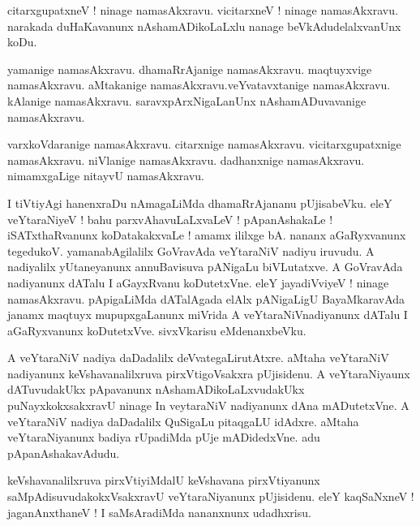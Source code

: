 \documentclass{article}
\begin{document}
\begin{mn}%
citarxgupatxneV ! ninage namasAkxravu. vicitarxneV ! ninage namasAkxravu. narakada duHaKavanunx 
nAshamADikoLaLxlu nanage beVkAdudelalxvanUnx koDu.
\end{mn}

\begin{mn}%
yamanige namasAkxravu. dhamaRrAjanige namasAkxravu. maqtuyxvige namasAkxravu. aMtakanige 
namasAkxravu.veYvatavxtanige namasAkxravu. kAlanige namasAkxravu. saravxpArxNigaLanUnx 
nAshamADuvavanige namasAkxravu.
\end{mn}

\begin{mn}%
varxkoVdaranige namasAkxravu. citarxnige namasAkxravu. vicitarxgupatxnige namasAkxravu. niVlanige 
namasAkxravu. dadhanxnige namasAkxravu. nimamxgaLige nitayvU namasAkxravu.
\end{mn}

\begin{mn}%
I tiVtiyAgi hanenxraDu nAmagaLiMda dhamaRrAjananu pUjisabeVku. eleY veYtaraNiyeV ! bahu 
parxvAhavuLaLxvaLeV ! pApanAshakaLe ! iSATxthaRvanunx koDatakakxvaLe ! amamx ililxge bA. nananx 
aGaRyxvanunx tegedukoV. yamanabAgilalilx GoVravAda veYtaraNiV nadiyu iruvudu. A nadiyalilx 
yUtaneyanunx annuBavisuva pANigaLu biVLutatxve. A GoVravAda nadiyanunx dATalu I aGayxRvanu 
koDutetxVne. eleY jayadiVviyeV ! ninage namasAkxravu. pApigaLiMda dATalAgada elAlx pANigaLigU 
BayaMkaravAda janamx maqtuyx mupupxgaLanunx miVrida A veYtaraNiVnadiyanunx dATalu I aGaRyxvanunx 
koDutetxVve. sivxVkarisu eMdenanxbeVku.
\end{mn}

\begin{mn}%
A veYtaraNiV nadiya daDadalilx deVvategaLirutAtxre. aMtaha veYtaraNiV nadiyanunx keVshavanalilxruva 
pirxVtigoVsakxra pUjisidenu. A veYtaraNiyaunx dATuvudakUkx pApavanunx nAshamADikoLaLxvudakUkx 
puNayxkokxsakxravU ninage In veytaraNiV nadiyanunx dAna mADutetxVne. A veYtaraNiV nadiya 
daDadalilx QuSigaLu pitaqgaLU idAdxre. aMtaha veYtaraNiyanunx badiya rUpadiMda pUje mADidedxVne. 
adu pApanAshakavAdudu.
\end{mn}

\begin{mn}%
keVshavanalilxruva pirxVtiyiMdalU keVshavana pirxVtiyanunx saMpAdisuvudakokxVsakxravU 
veYtaraNiyanunx pUjisidenu. eleY kaqSaNxneV ! jaganAnxthaneV ! I saMsAradiMda nananxnunx udadhxrisu.
\end{mn}
\end{document}
